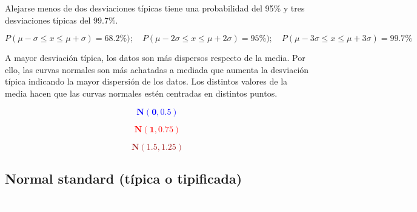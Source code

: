 Alejarse menos de dos desviaciones típicas tiene una probabilidad del 95\% y tres desviaciones típicas del 99.7\%. 

\begin{small}$$P(\mu-\sigma\le x \le \mu+\sigma)=68.2\%); \quad P(\mu-2\sigma\le x \le \mu+2\sigma)=95\%); \quad P(\mu-3\sigma\le x \le \mu+3\sigma)=99.7\%$$\end{small}


\begin{destacado}
\begin{adjustwidth}{10pt}{10pt}
A mayor desviación típica, los datos son más dispersos respecto de la media. Por ello, las curvas normales son más achatadas a mediada que aumenta la desviación típica indicando la mayor dispersión de los datos.  Los distintos valores de la media hacen que las curvas normales estén centradas en distintos puntos.
\end{adjustwidth}
\end{destacado}



\begin{multicols}{2}


\textcolor{blue}{$$\boldsymbol{N(0,0.5)}$$}


\textcolor{red}{$$\boldsymbol{N(1,0.75)}$$}


\textcolor{brown}{$$\boldsymbol{N(1.5,1.25)}$$}
\end{multicols}

\subsection{Normal standard \small{(típica o tipificada)}}\normalsize{\textcolor{white}{.}}

